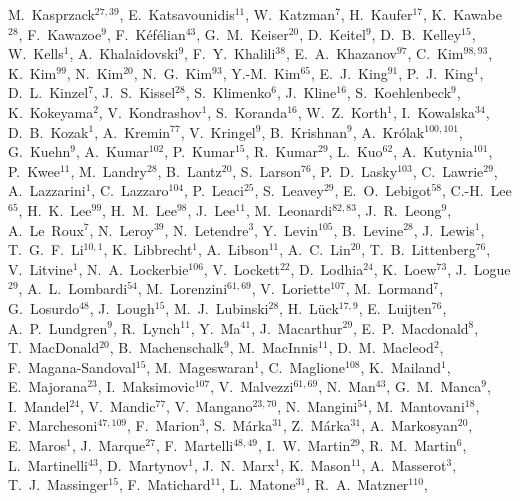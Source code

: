 \documentclass[12pt]{iopart}
\begin{document}
{M.~Kasprzack$^{27,39}$, 
E.~Katsavounidis$^{11}$, 
W.~Katzman$^{7}$, 
H.~Kaufer$^{17}$, 
K.~Kawabe$^{28}$, 
F.~Kawazoe$^{9}$, 
F.~K\'ef\'elian$^{43}$, 
G.~M.~Keiser$^{20}$, 
D.~Keitel$^{9}$, 
D.~B.~Kelley$^{15}$, 
W.~Kells$^{1}$, 
A.~Khalaidovski$^{9}$, 
F.~Y.~Khalili$^{38}$, 
E.~A.~Khazanov$^{97}$, 
C.~Kim$^{98,93}$, 
K.~Kim$^{99}$, 
N.~Kim$^{20}$, 
N.~G.~Kim$^{93}$, 
Y.-M.~Kim$^{65}$, 
E.~J.~King$^{91}$, 
P.~J.~King$^{1}$, 
D.~L.~Kinzel$^{7}$, 
J.~S.~Kissel$^{28}$, 
S.~Klimenko$^{6}$, 
J.~Kline$^{16}$, 
S.~Koehlenbeck$^{9}$, 
K.~Kokeyama$^{2}$, 
V.~Kondrashov$^{1}$, 
S.~Koranda$^{16}$, 
W.~Z.~Korth$^{1}$, 
I.~Kowalska$^{34}$, 
D.~B.~Kozak$^{1}$, 
A.~Kremin$^{77}$, 
V.~Kringel$^{9}$, 
B.~Krishnan$^{9}$, 
A.~Kr\'olak$^{100,101}$, 
G.~Kuehn$^{9}$, 
A.~Kumar$^{102}$, 
P.~Kumar$^{15}$, 
R.~Kumar$^{29}$, 
L.~Kuo$^{62}$, 
A.~Kutynia$^{101}$, 
P.~Kwee$^{11}$, 
M.~Landry$^{28}$, 
B.~Lantz$^{20}$, 
S.~Larson$^{76}$, 
P.~D.~Lasky$^{103}$, 
C.~Lawrie$^{29}$, 
A.~Lazzarini$^{1}$, 
C.~Lazzaro$^{104}$, 
P.~Leaci$^{25}$, 
S.~Leavey$^{29}$, 
E.~O.~Lebigot$^{58}$, 
C.-H.~Lee$^{65}$, 
H.~K.~Lee$^{99}$, 
H.~M.~Lee$^{98}$, 
J.~Lee$^{11}$, 
M.~Leonardi$^{82,83}$, 
J.~R.~Leong$^{9}$, 
A.~Le~Roux$^{7}$, 
N.~Leroy$^{39}$, 
N.~Letendre$^{3}$, 
Y.~Levin$^{105}$, 
B.~Levine$^{28}$, 
J.~Lewis$^{1}$, 
T.~G.~F.~Li$^{10,1}$, 
K.~Libbrecht$^{1}$, 
A.~Libson$^{11}$, 
A.~C.~Lin$^{20}$, 
T.~B.~Littenberg$^{76}$, 
V.~Litvine$^{1}$, 
N.~A.~Lockerbie$^{106}$, 
V.~Lockett$^{22}$, 
D.~Lodhia$^{24}$, 
K.~Loew$^{73}$, 
J.~Logue$^{29}$, 
A.~L.~Lombardi$^{54}$, 
M.~Lorenzini$^{61,69}$, 
V.~Loriette$^{107}$, 
M.~Lormand$^{7}$, 
G.~Losurdo$^{48}$, 
J.~Lough$^{15}$, 
M.~J.~Lubinski$^{28}$, 
H.~L\"uck$^{17,9}$, 
E.~Luijten$^{76}$, 
A.~P.~Lundgren$^{9}$, 
R.~Lynch$^{11}$, 
Y.~Ma$^{41}$, 
J.~Macarthur$^{29}$, 
E.~P.~Macdonald$^{8}$, 
T.~MacDonald$^{20}$, 
B.~Machenschalk$^{9}$, 
M.~MacInnis$^{11}$, 
D.~M.~Macleod$^{2}$, 
F.~Magana-Sandoval$^{15}$, 
M.~Mageswaran$^{1}$, 
C.~Maglione$^{108}$, 
K.~Mailand$^{1}$, 
E.~Majorana$^{23}$, 
I.~Maksimovic$^{107}$, 
V.~Malvezzi$^{61,69}$, 
N.~Man$^{43}$, 
G.~M.~Manca$^{9}$, 
I.~Mandel$^{24}$, 
V.~Mandic$^{77}$, 
V.~Mangano$^{23,70}$, 
N.~Mangini$^{54}$, 
M.~Mantovani$^{18}$, 
F.~Marchesoni$^{47,109}$, 
F.~Marion$^{3}$, 
S.~M\'arka$^{31}$, 
Z.~M\'arka$^{31}$, 
A.~Markosyan$^{20}$, 
E.~Maros$^{1}$, 
J.~Marque$^{27}$, 
F.~Martelli$^{48,49}$, 
I.~W.~Martin$^{29}$, 
R.~M.~Martin$^{6}$, 
L.~Martinelli$^{43}$, 
D.~Martynov$^{1}$, 
J.~N.~Marx$^{1}$, 
K.~Mason$^{11}$, 
A.~Masserot$^{3}$, 
T.~J.~Massinger$^{15}$, 
F.~Matichard$^{11}$, 
L.~Matone$^{31}$, 
R.~A.~Matzner$^{110}$, 
}
\end{document}
